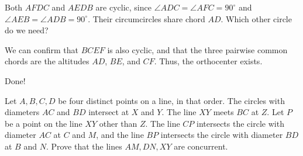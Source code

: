 











Both $AFDC$ and $AEDB$ are cyclic, since $\angle ADC = \angle AFC = 90^\circ$ and $\angle AEB = \angle ADB = 90^\circ$. Their circumcircles share chord $AD$. Which other circle do we need?





We can confirm that $BCEF$ is also cyclic, and that the three pairwise common chords are the altitudes $AD$, $BE$, and $CF$. Thus, the orthocenter exists.

Done!

\begin{example}
    Let $A,B,C,D$ be four distinct points on a line, in that order. The circles with diameters $AC$ and $BD$ intersect at $X$ and $Y$. The line $XY$ meets $BC$ at $Z$. Let $P$ be a point on the line $XY$ other than $Z$. The line $CP$ intersects the circle with diameter $AC$ at $C$ and $M$, and the line $BP$ intersects the circle with diameter $BD$ at $B$ and $N$. Prove that the lines $AM,DN,XY$ are concurrent.    
\end{example}

